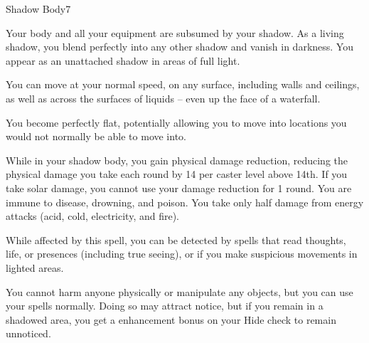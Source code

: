 \begin{spellfooter}
\begin{spellsection}{Shadow Body}{7}
    \begin{spellheader}
        \begin{spelltargetinginfo}
        \end{spelltargetinginfo}
    \end{spellheader}
    \begin{spellcontent}
        \begin{spelleffects}
            \spelleffect Your body and all your equipment are subsumed by your shadow. As a living shadow, you blend perfectly into any other shadow and vanish in darkness. You appear as an unattached shadow in areas of full light.
            \par You can move at your normal speed, on any surface, including walls and ceilings, as well as across the surfaces of liquids -- even up the face of a waterfall.
            \par You become perfectly flat, potentially allowing you to move into locations you would not normally be able to move into.
            \par While in your shadow body, you gain physical damage reduction, reducing the physical damage you take each round by 14  per caster level above 14th. If you take solar damage, you cannot use your damage reduction for 1 round. You are immune to disease, drowning, and poison. You take only half damage from energy attacks (acid, cold, electricity, and fire).
            \par While affected by this spell, you can be detected by spells that read thoughts, life, or presences (including true seeing), or if you make suspicious movements in lighted areas.
            \par You cannot harm anyone physically or manipulate any objects, but you can use your spells normally. Doing so may attract notice, but if you remain in a shadowed area, you get a  enhancement bonus on your Hide check to remain unnoticed.
            \spelldur \durmed \dismissable
        \end{spelleffects}
    \end{spellcontent}
    \begin{spellfooter}
    \end{spellfooter}
\end{spellsection}


\end{spellfooter}
